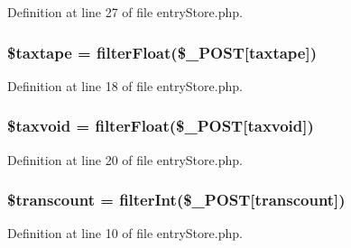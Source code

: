 Definition at line 27 of file entry\+Store.\+php.

\subsubsection[{\texorpdfstring{\$taxtape}{$taxtape}}]{\setlength{\rightskip}{0pt plus 5cm}\$taxtape = {\bf filter\+Float}(\$\+\_\+\+P\+O\+ST\mbox{[}\textquotesingle{}taxtape\textquotesingle{}\mbox{]})}\hypertarget{entry_store_8php_a848133982d92206673becfebaf364f83}{}\label{entry_store_8php_a848133982d92206673becfebaf364f83}


Definition at line 18 of file entry\+Store.\+php.

\subsubsection[{\texorpdfstring{\$taxvoid}{$taxvoid}}]{\setlength{\rightskip}{0pt plus 5cm}\$taxvoid = {\bf filter\+Float}(\$\+\_\+\+P\+O\+ST\mbox{[}\textquotesingle{}taxvoid\textquotesingle{}\mbox{]})}\hypertarget{entry_store_8php_a60120472d8e892fe568fc61eaf53393e}{}\label{entry_store_8php_a60120472d8e892fe568fc61eaf53393e}


Definition at line 20 of file entry\+Store.\+php.

\subsubsection[{\texorpdfstring{\$transcount}{$transcount}}]{\setlength{\rightskip}{0pt plus 5cm}\$transcount = {\bf filter\+Int}(\$\+\_\+\+P\+O\+ST\mbox{[}\textquotesingle{}transcount\textquotesingle{}\mbox{]})}\hypertarget{entry_store_8php_a63fbfb73628737f907460ff60b5dca1f}{}\label{entry_store_8php_a63fbfb73628737f907460ff60b5dca1f}


Definition at line 10 of file entry\+Store.\+php.

